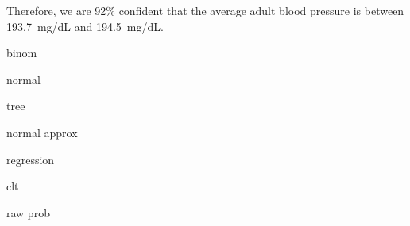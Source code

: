 \documentclass[12pt,letterpaper]{exam}
\begin{document}
\begin{questions}
{Therefore, we are 92\% confident that the average adult blood pressure is between 193.7~mg/dL and 194.5~mg/dL. 
}

\newpage
\question binom

\newpage
\question normal

\newpage
\question tree

\newpage
\question normal approx

\newpage
\question regression

\newpage
\question clt

\newpage
\question raw prob




















\end{questions}
\end{document}
